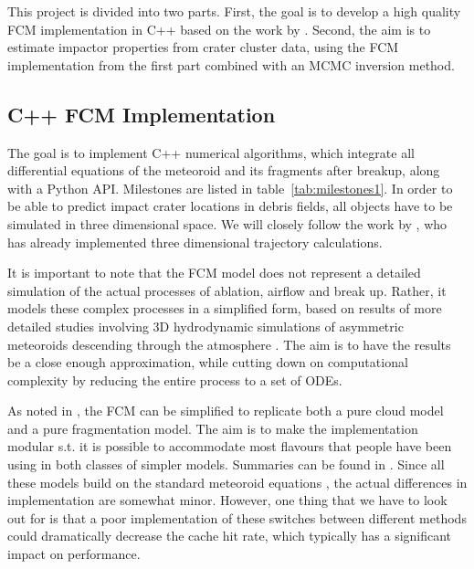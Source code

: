 This project is divided into two parts.
First, the goal is to develop a high quality FCM implementation in C++ based on the work by \cite{newland2019CFM18}.
Second, the aim is to estimate impactor properties from crater cluster data, using the FCM implementation from the first part combined with an MCMC inversion method.

\subsection{C++ FCM Implementation}
\label{sec:goal1}
The goal is to implement C++ numerical algorithms, which integrate all differential equations of the meteoroid and its fragments after breakup, along with a Python API.
Milestones are listed in table~\ref{tab:milestones1}.
In order to be able to predict impact crater locations in debris fields, all objects have to be simulated in three dimensional space.
We will closely follow the work by \cite{newland2019CFM18}, who has already implemented three dimensional trajectory calculations.

It is important to note that the FCM model does not represent a detailed simulation of the actual processes of ablation, airflow and break up.
Rather, it models these complex processes in a simplified form, based on results of more detailed studies involving 3D hydrodynamic simulations of asymmetric meteoroids descending through the atmosphere \citep[e.g.][]{artemieva1996interaction,artemieva2001motion}.
The aim is to have the results be a close enough approximation, while cutting down on computational complexity by reducing the entire process to a set of ODEs.

As noted in \cite{newland2019CFM18}, the FCM can be simplified to replicate both a pure cloud model and a pure fragmentation model.
The aim is to make the implementation modular s.t. it is possible to accommodate most flavours that people have been using in both classes of simpler models.
Summaries can be found in \cite{artemieva1996interaction,artemieva2001motion,register2017asteroid,mcmullan2019uncertainty}.
Since all these models build on the standard meteoroid equations \citep[e.g.][]{opik1958physics}, the actual differences in implementation are somewhat minor.
However, one thing that we have to look out for is that a poor implementation of these switches between different methods could dramatically decrease the cache hit rate, which typically has a significant impact on performance.

